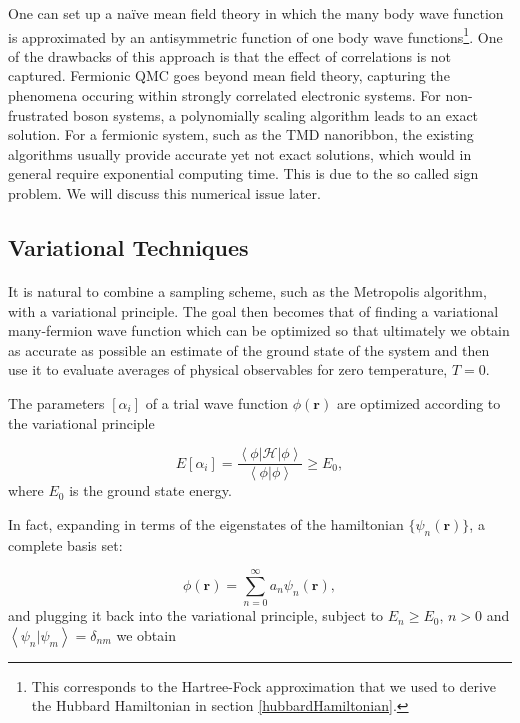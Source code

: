\documentclass[10pt, twocolumn, twoside]{article}
\begin{document}
One can set up a na\"ive mean field theory in which the many body wave function is approximated by an antisymmetric function of one body wave functions\footnote{This corresponds to the Hartree-Fock approximation that we used to derive the Hubbard Hamiltonian in section \ref{hubbardHamiltonian}.}. One of the drawbacks of this approach is that the effect of  correlations is not captured. Fermionic QMC goes beyond mean field theory,  capturing the phenomena occuring within strongly correlated electronic systems. For non-frustrated boson systems, a polynomially scaling algorithm leads to an exact solution. For a fermionic system, such as the TMD nanoribbon, the existing algorithms usually provide accurate yet not exact solutions, which would in general require exponential computing time. This is due to the so called sign problem. We will discuss this numerical issue later. 

\subsection{Variational Techniques}\paragraph{}

It is natural to combine a sampling scheme, such as the Metropolis algorithm, with a variational principle. The goal then becomes that of finding a variational many-fermion wave function which can be optimized so that ultimately we obtain as accurate as possible an estimate of the ground state of the system and then use it to evaluate averages of physical observables for zero temperature, $T=0$.

The parameters $[\alpha_i]$ of a trial wave function $\phi(\bm r)$ are optimized according to the variational principle

\begin{equation}
E[\alpha_i] = \frac{\left\langle \phi \left| \mathcal{H} \right| \phi \right\rangle}{\left\langle \phi | \phi \right\rangle} \ge E_0,
\end{equation}
where $E_0$ is the ground state energy.

In fact, expanding in terms of the eigenstates of the hamiltonian $\{ \psi_n (\bm r) \}$, a complete basis set:

\begin{equation}
\phi (\bm r) = \sum_{n= 0}^{\infty} a_n \psi_n (\bm r) ,
\end{equation}
and plugging it back into the variational principle, subject to $E_n \ge E_0 ,\, n > 0$ and $\left\langle \psi_n | \psi_m \right\rangle = \delta_{nm}$ we obtain
\end{document}
